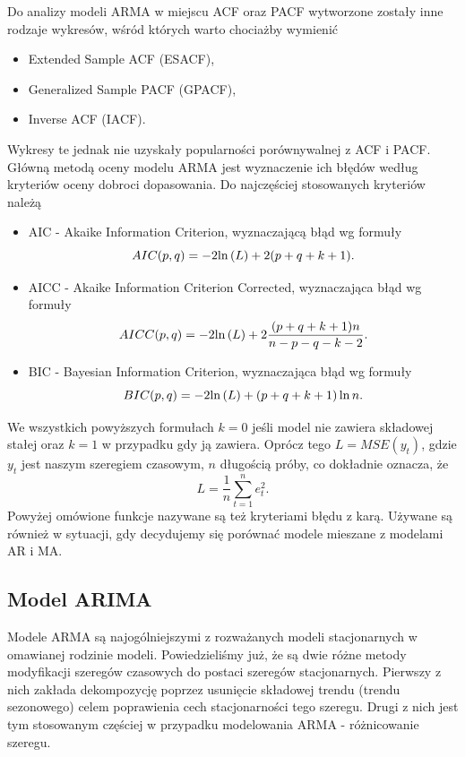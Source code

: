\documentclass[10pt,a4paper]{book}
\begin{document}
Do analizy modeli ARMA w miejscu ACF oraz PACF wytworzone zostały inne rodzaje wykresów, wśród których warto chociażby wymienić

\begin{itemize}
\item Extended Sample ACF (ESACF), 
\item Generalized Sample PACF (GPACF),
\item Inverse ACF (IACF).
\end{itemize}

Wykresy te jednak nie uzyskały popularności porównywalnej z ACF i PACF. Główną metodą oceny modelu ARMA jest wyznaczenie ich błędów według kryteriów oceny dobroci dopasowania. Do najczęściej stosowanych kryteriów należą 

\begin{itemize}
\item AIC - Akaike Information Criterion, wyznaczającą błąd wg formuły 
$$
AIC(p,q) = -2 {{\ln}\left( {L} \right)} + 2 {\left( {p+q+k+1} \right)}.
$$
\item AICC - Akaike Information Criterion Corrected, wyznaczająca błąd wg formuły 
$$
AICC(p,q) = -2 {{\ln}\left( {L} \right)} + 2 \frac{{\left( {p+q+k+1} \right)}  n}{n-p-q-k-2}.
$$
\item BIC - Bayesian Information Criterion, wyznaczająca błąd wg formuły
$$
BIC(p,q) = -2 {{\ln}\left( {L} \right)} + {\left( {p+q+k+1} \right)} \ln n.
$$
\end{itemize}
We wszystkich powyższych formułach $k=0$ jeśli model nie zawiera składowej stałej oraz $k=1$ w przypadku gdy ją zawiera. Oprócz tego $L=MSE(y_t)$, gdzie $y_t$ jest naszym szeregiem czasowym, $n$ długością próby, co dokładnie oznacza, że 
$$
L = \frac{1}{n} \sum_{t=1}^{n} e_t^2.
$$
Powyżej omówione funkcje nazywane są też kryteriami błędu z karą. Używane są również w sytuacji, gdy decydujemy się porównać modele mieszane z modelami AR i MA.

\subsection{Model ARIMA}

Modele ARMA są najogólniejszymi z rozważanych modeli stacjonarnych w omawianej rodzinie modeli. Powiedzieliśmy już, że są dwie różne metody modyfikacji szeregów czasowych do postaci szeregów stacjonarnych. Pierwszy z nich zakłada dekompozycję poprzez usunięcie składowej trendu (trendu sezonowego) celem poprawienia cech stacjonarności tego szeregu. Drugi z nich jest tym stosowanym częściej w przypadku modelowania ARMA - różnicowanie szeregu.
\end{document}
